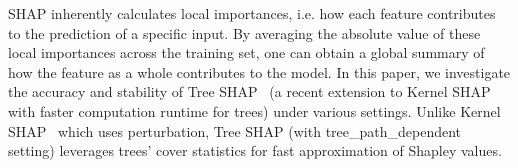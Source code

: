 SHAP inherently calculates local importances, i.e. how each feature contributes to the prediction of a specific input. By averaging the absolute value of these local importances across the training set, one can obtain a global summary of how the feature as a whole contributes to the model. %
In this paper, we investigate the accuracy and stability of Tree SHAP~\cite{lundberg2020local2global} (a recent extension to Kernel SHAP with faster computation runtime for trees) under various settings. Unlike Kernel SHAP~\cite{NIPS2017_7062} which uses perturbation, Tree SHAP (with tree\_path\_dependent setting) leverages trees' cover statistics for fast approximation of Shapley values. %

